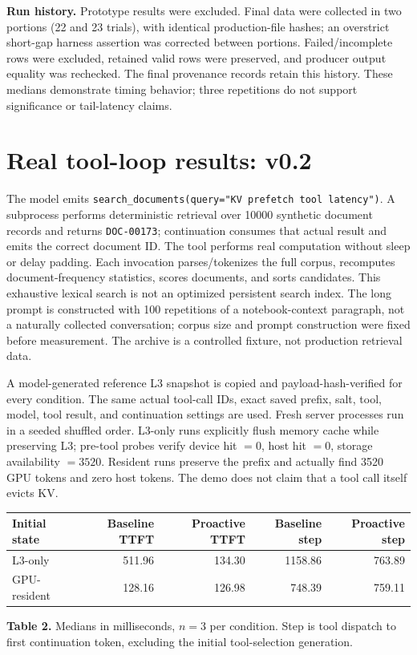 \documentclass[10pt,a4paper]{article}
\newcommand{\code}[1]{\texttt{#1}}
\newcommand{\pagemark}{\newpage}
\begin{document}
\textbf{Run history.} Prototype results were excluded. Final data were collected in two portions (22 and 23 trials), with identical production-file hashes; an overstrict short-gap harness assertion was corrected between portions. Failed/incomplete rows were excluded, retained valid rows were preserved, and producer output equality was rechecked. The final provenance records retain this history. These medians demonstrate timing behavior; three repetitions do not support significance or tail-latency claims.

\pagemark
\section{Real tool-loop results: v0.2}
The model emits \code{search\_documents(query="KV prefetch tool latency")}. A subprocess performs deterministic retrieval over 10000 synthetic document records and returns \code{DOC-00173}; continuation consumes that actual result and emits the correct document ID. The tool performs real computation without sleep or delay padding. Each invocation parses/tokenizes the full corpus, recomputes document-frequency statistics, scores documents, and sorts candidates. This exhaustive lexical search is not an optimized persistent search index. The long prompt is constructed with 100 repetitions of a notebook-context paragraph, not a naturally collected conversation; corpus size and prompt construction were fixed before measurement. The archive is a controlled fixture, not production retrieval data.

A model-generated reference L3 snapshot is copied and payload-hash-verified for every condition. The same actual tool-call IDs, exact saved prefix, salt, tool, model, tool result, and continuation settings are used. Fresh server processes run in a seeded shuffled order. L3-only runs explicitly flush memory cache while preserving L3; pre-tool probes verify device hit $=0$, host hit $=0$, storage availability $=3520$. Resident runs preserve the prefix and actually find 3520 GPU tokens and zero host tokens. The demo does not claim that a tool call itself evicts KV.

\begin{center}\small
\begin{tabular}{@{}lrrrr@{}}\toprule
Initial state & Baseline TTFT & Proactive TTFT & Baseline step & Proactive step\\\midrule
L3-only &511.96&134.30&1158.86&763.89\\
GPU-resident &128.16&126.98&748.39&759.11\\\bottomrule
\end{tabular}\end{center}
{\small\textbf{Table 2.} Medians in milliseconds, $n=3$ per condition. Step is tool dispatch to first continuation token, excluding the initial tool-selection generation.}
\end{document}
